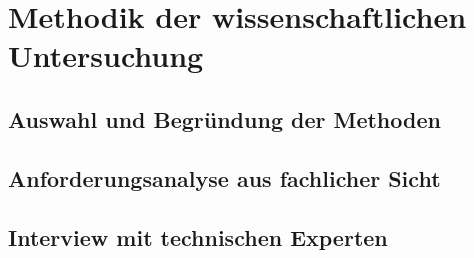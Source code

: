 \chapter{Methodik der wissenschaftlichen Untersuchung}
\section{Auswahl und Begründung der Methoden}



\newpage
\section{Anforderungsanalyse aus fachlicher Sicht}


\newpage
\section{Interview mit technischen Experten}
